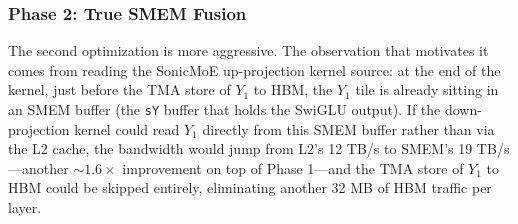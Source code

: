 \documentclass[10pt]{article}
\begin{document}
\subsubsection{Phase 2: True SMEM Fusion}
The second optimization is more aggressive. The observation that motivates it comes from reading the SonicMoE up-projection kernel source: at the end of the kernel, just before the TMA store of $Y_1$ to HBM, the $Y_1$ tile is already sitting in an SMEM buffer (the \texttt{sY} buffer that holds the SwiGLU output). If the down-projection kernel could read $Y_1$ directly from this SMEM buffer rather than via the L2 cache, the bandwidth would jump from L2's 12 TB/s to SMEM's 19 TB/s---another $\sim 1.6\times$ improvement on top of Phase 1---and the TMA store of $Y_1$ to HBM could be skipped entirely, eliminating another 32 MB of HBM traffic per layer.
\end{document}
